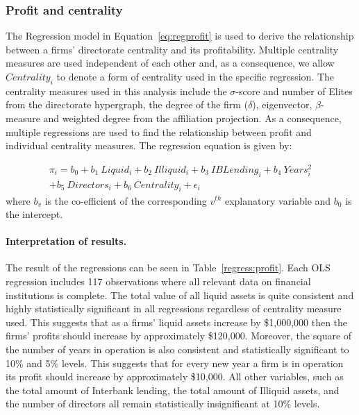 \documentclass[11pt,fleqn]{article}
\begin{document}
\subsubsection*{Profit and centrality}

The Regression model in Equation~\ref{eq:regprofit} is used to derive the relationship between a firms' directorate centrality and its profitability. Multiple centrality measures are used independent of each other and, as a consequence, we allow $Centrality_{i}$ to denote a form of centrality used in the specific regression. The centrality measures used in this analysis include the $\sigma$-score and number of Elites from the directorate hypergraph, the degree of the firm ($\delta$), eigenvector, $\beta$-measure and weighted degree from the affiliation projection. As a consequence, multiple regressions are used to find the relationship between profit and individual centrality measures. The regression equation is given by:

\begin{multline} \label{eq:regprofit}
\pi_{i} = b_{0} + b_{1}~Liquid_{i} + b_{2}~Illiquid_{i} + b_{3}~IBLending_{i} + b_{4}~Years^{2}_{i}\\
+ b_{5}~Directors_{i} + b_{6}~Centrality_{i} + \epsilon_{i}
\end{multline}
where $b_{v}$ is the co-efficient of the corresponding $v^{th}$ explanatory variable and $b_{0}$ is the intercept.

\paragraph{Interpretation of results.}

The result of the regressions can be seen in Table~\ref{regress:profit}. Each OLS regression includes 117 observations where all relevant data on financial institutions is complete. The total value of all liquid assets is quite consistent and highly statistically significant in all regressions regardless of centrality measure used. This suggests that as a firms' liquid assets increase by \$1,000,000 then the firms' profits should increase by approximately \$120,000. Moreover, the square of the number of years in operation is also consistent and statistically significant to 10\% and 5\% levels. This suggests that for every new year a firm is in operation its profit should increase by approximately \$10,000. All other variables, such as the total amount of Interbank lending, the total amount of Illiquid assets, and the number of directors all remain statistically insignificant at 10\% levels.
\end{document}
